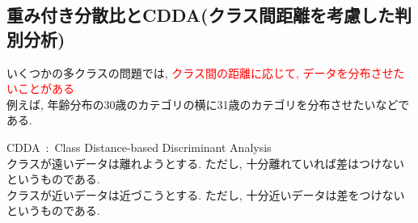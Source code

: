 \documentclass[dvipdfmx,a4j]{jsarticle}
\begin{document}
  \subsection{重み付き分散比とCDDA(クラス間距離を考慮した判別分析)}
  いくつかの多クラスの問題では, \textcolor{red}{クラス間の距離に応じて, データを分布させたいことがある}\\
  例えば, 年齢分布の30歳のカテゴリの横に31歳のカテゴリを分布させたいなどである.
  \begin{center}
  \end{center}
  CDDA\ :\ Class Distance-based Discriminant Analysis\\
  クラスが遠いデータは離れようとする. ただし, 十分離れていれば差はつけないというものである.\\
  クラスが近いデータは近づこうとする. ただし, 十分近いデータは差をつけないというものである.
  
\end{document}

